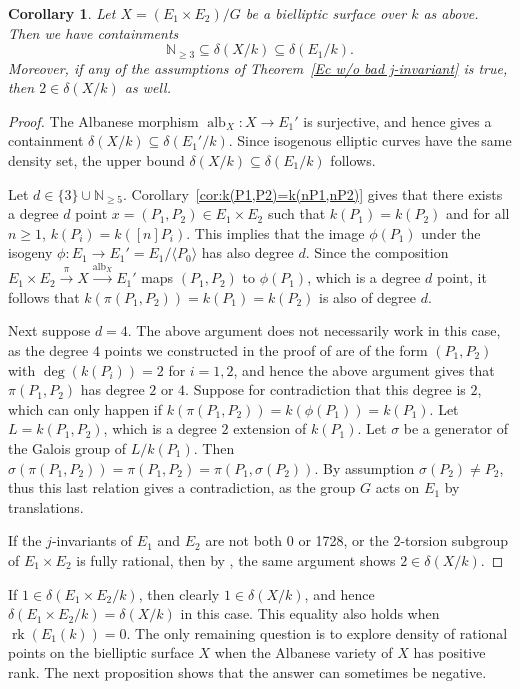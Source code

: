 \documentclass[a4paper,11pt]{amsart}
\theoremstyle{plain}
\newtheorem{coroll}[thm]{Corollary}
\theoremstyle{remark}
\DeclareMathOperator{\alb}{alb}
\newcommand{\nn}{\mathbb{N}}
\newcommand{\rk}{\operatorname{rk}}
\newcommand{\dendegs}{\delta}
\begin{document}
\begin{coroll}\label{cor:biellipticsurface}
    Let $X=(E_1\times E_2)/G$ be a bielliptic surface over $k$ as above. Then we have containments \[\nn_{\geq 3}\subseteq\dendegs(X/k)\subseteq\dendegs(E_1/k).\] 
    Moreover, if any of the assumptions of Theorem~\ref{Ec w/o bad j-invariant} is true, then $2\in\dendegs(X/k)$ as well.
\end{coroll}
\begin{proof} The Albanese morphism $\alb_X:X\to E_1'$ is surjective, and hence 
 gives a containment $\dendegs(X/k)\subseteq\dendegs(E_1'/k)$. Since isogenous elliptic curves have the same density set, the upper bound $\dendegs(X/k)\subseteq\dendegs(E_1/k)$ follows. 

Let $d\in \{3\}\cup\nn_{\geq 5}$. Corollary~\ref{cor:k(P1,P2)=k(nP1,nP2)} gives that there exists a degree $d$ point $x=(P_1,P_2)\in E_1\times E_2$ such that $k(P_1)=k(P_2)$ and for all $n\geq 1$, $k(P_i)=k([n]P_i)$. 
This implies that the image $\phi(P_1)$ under the isogeny $\phi:E_1\to E_1'=E_1/\langle P_0\rangle$ has also degree $d$. Since the composition $E_1\times E_2\xrightarrow{\pi}X\xrightarrow{\alb_X}E_1'$ maps $(P_1,P_2)$ to $\phi(P_1)$, which is a degree $d$ point, it follows that $k(\pi(P_1,P_2))=k(P_1)=k(P_2)$ is also of degree $d$. 

Next suppose $d=4$. The above argument does not necessarily work in this case, as the degree $4$ points we constructed in the proof of  are of the form $(P_1,P_2)$ with $\deg(k(P_i))=2$ for $i=1,2$, and hence the above argument gives that $\pi(P_1,P_2)$ has degree $2$ or $4$. Suppose for contradiction that this degree is $2$, which can only happen if 
$k(\pi(P_1,P_2))=k(\phi(P_1))=k(P_1)$. Let $L=k(P_1, P_2)$, which is a degree $2$ extension of $k(P_1)$. Let $\sigma$ be a generator of the Galois group of $L/k(P_1)$. Then $\sigma(\pi(P_1,P_2))=\pi(P_1,P_2)=\pi(P_1, \sigma(P_2))$. By assumption $\sigma(P_2)\neq P_2$, thus this last relation gives a contradiction, as the group $G$ acts on $E_1$ by translations.

If the $j$-invariants of $E_1$ and $E_2$ are not both 0 or 1728, or the $2$-torsion subgroup of $E_1\times E_2$ is fully rational, then by , the same argument shows $2 \in \delta(X/k)$. 
\end{proof} 

If $1\in\dendegs(E_1\times E_2/k)$, then clearly $1\in\dendegs(X/k)$, and hence  $\dendegs(E_1\times E_2/k)=\dendegs(X/k)$ in this case. This equality also holds when $\rk(E_1(k))=0$. The only remaining question is to explore density of rational points on the bielliptic surface $X$ when the Albanese variety of $X$ has positive rank. The next proposition shows that the answer can sometimes be negative.
\end{document}
